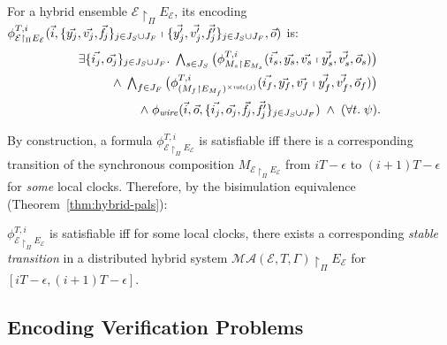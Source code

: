 \begin{definition}
For a hybrid ensemble $\mathcal{E} \restriction_{\Pi} E_\mathcal{E}$, %
its encoding
$\phi_{\mathcal{E} \restriction_{\Pi} E_\mathcal{E}}^{T,i}(
	\vec{i}, \{\vec{y_j}, \vec{v_j},\vec{\mathit{f}_j}\}_{j\in J_S\cup J_F}
	\shortmid 
	\{\vec{y'_j}, \vec{v'_j}, \vec{\mathit{f}_j'}\}_{j\in J_S\cup J_F}, \vec{o})$ is:
\begin{align*}
\exists \{\vec{i_j},\vec{o_j}\}_{j\in J_S\cup J_F}.\;
\textstyle\bigwedge_{s \in J_S}
\big(\phi_{M_s \restriction E_{M_s}}^{T,i}(\vec{i_s}, \vec{y_s}, \vec{v_s} \shortmid \vec{y'_s}, \vec{v'_s}, \vec{o}_s)\big)
\phantom{.}
\\
\wedge\;
\textstyle\bigwedge_{f \in J_F}
\big(\phi_{(M_f \restriction E_{M_f})^{\times\mathit{rate}(j)}}^{T,i}(\vec{i_f}, \vec{y_f}, \vec{v_f} \shortmid \vec{y'_f}, \vec{v'_f}, \vec{o}_f)\big)
\phantom{.}
\\
\wedge\;
\phi_\mathit{wire}(\vec{i},\vec{o},\{\vec{i_j},\vec{o_j},\vec{\mathit{f}_j},\vec{\mathit{f}_j'}\}_{j\in J_S\cup J_F})
\;\wedge\;
(\forall t.\; \psi).
\end{align*}
\end{definition}

By construction, a formula $\phi_{\mathcal{E} \restriction_{\Pi} E_\mathcal{E}}^{T,i}$ is satisfiable
iff there is a corresponding transition of the synchronous composition $M_{\mathcal{E} \restriction_{\Pi} E_\mathcal{E}}$
from $iT - \epsilon$ to $(i+1)T - \epsilon$ for \emph{some} local clocks.
Therefore, by  the bisimulation equivalence (Theorem~\ref{thm:hybrid-pals}):

\begin{theorem}\label{thm:pals-encoding}
$\phi_{\mathcal{E} \restriction_{\Pi} E_\mathcal{E}}^{T,i}$ is satisfiable 
iff for some local clocks, there exists a corresponding \emph{stable transition} in a distributed hybrid system  
$\mathcal{MA}(\mathcal{E}, T, \Gamma) \restriction_{\Pi} E_\mathcal{E}$   for $[iT - \epsilon,(i+1)T - \epsilon]$.
\end{theorem}

\subsection{Encoding Verification Problems}

